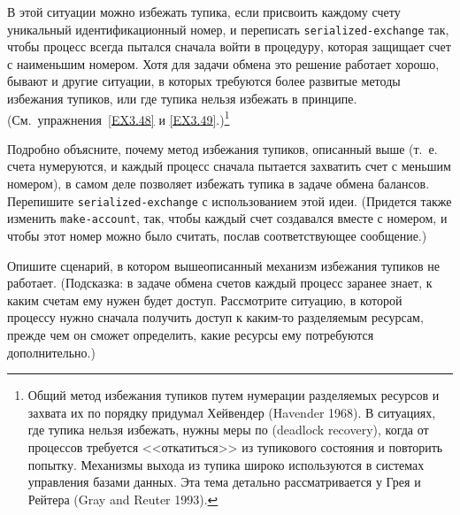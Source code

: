 В этой ситуации можно избежать тупика, если присвоить каждому
счету уникальный идентификационный номер, и переписать
{\tt serialized-exchange} так, чтобы процесс всегда пытался
сначала войти в процедуру, которая защищает счет с наименьшим
номером.  Хотя для задачи обмена это решение работает хорошо, бывают и
другие ситуации, в которых требуются более развитые методы избежания
тупиков, или где тупика нельзя избежать в принципе.
(См.~упражнения~\ref{EX3.48} и \ref{EX3.49}.)\footnote{Общий метод избежания тупиков путем нумерации
  разделяемых ресурсов и захвата их по порядку придумал Хейвендер
  (Havender 1968).  В ситуациях, где тупика нельзя
  избежать,
  нужны меры по
   (deadlock recovery), когда от
  процессов требуется <<откатиться>> из тупикового состояния и повторить
  попытку.  Механизмы выхода из тупика широко используются в
  системах управления базами данных.  Эта тема детально рассматривается
  у Грея и Рейтера (Gray and Reuter 1993). }
{\sloppy

}
\begin{exercise}{3.48}\label{EX3.48}%
Подробно объясните, почему метод избежания тупиков,
описанный выше (т.~е. счета нумеруются, и каждый процесс сначала
пытается захватить счет с меньшим номером), в самом деле позволяет
избежать тупика в задаче
обмена балансов.  Перепишите
{\tt serialized-exchange}
с использованием этой идеи.  (Придется также изменить
{\tt make-account}, так, чтобы каждый счет создавался вместе с
номером, и чтобы этот номер можно было считать, послав
соответствующее сообщение.)
\end{exercise}
\begin{exercise}{3.49}\label{EX3.49}%
Опишите сценарий, в котором вышеописанный механизм
избежания тупиков не работает.  (Подсказка: в задаче обмена счетов
каждый процесс заранее знает, к каким счетам ему нужен будет доступ.
Рассмотрите ситуацию, в которой процессу нужно сначала получить доступ к каким-то
разделяемым ресурсам, прежде чем он сможет определить, какие ресурсы
ему потребуются дополнительно.)
\end{exercise}

